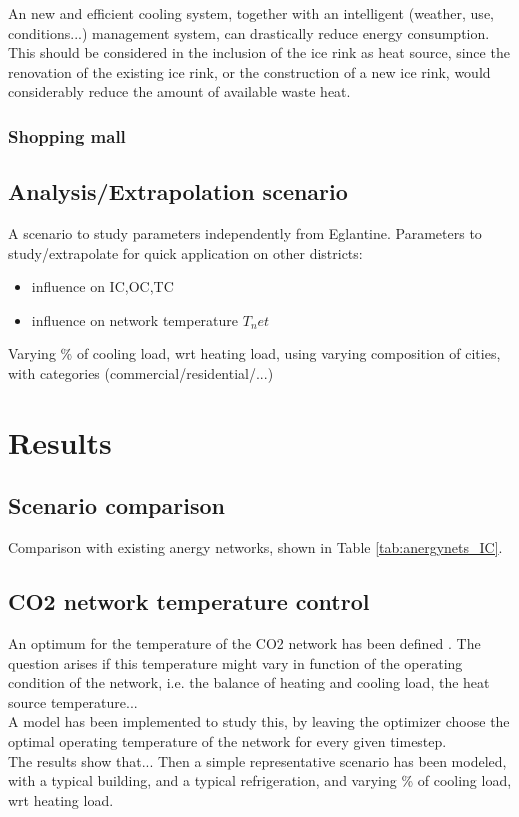 \documentclass{article}
\begin{document}
An new and efficient cooling system, together with an intelligent (weather, use, conditions...) management system, can drastically reduce energy consumption. This should be considered in the inclusion of the ice rink as heat source, since the renovation of the existing ice rink, or the construction of a new ice rink, would considerably reduce the amount of available waste heat.

\subsubsection{Shopping mall}

\subsection{Analysis/Extrapolation scenario}
A scenario to study parameters independently from Eglantine.
Parameters to study/extrapolate for quick application on other districts:
\begin{itemize}
    \item influence on IC,OC,TC
    \item influence on network temperature $T_net$  
\end{itemize}
Varying \% of cooling load, wrt heating load, using varying composition of cities, with categories (commercial/residential/...)


\section{Results}

\subsection{Scenario comparison}
Comparison with existing anergy networks, shown in Table \ref{tab:anergynets_IC}.


\subsection{CO2 network temperature control}
An optimum for the temperature of the CO2 network has been defined .
The question arises if this temperature might vary in function of the operating condition of the network, i.e. the balance of heating and cooling load, the heat source temperature...\\
A model has been implemented to study this, by leaving the optimizer choose the optimal operating temperature of the network for every given timestep.\\
The results show that...
Then a simple representative scenario has been modeled, with a typical building, and a typical refrigeration, and varying \% of cooling load, wrt heating load.
\end{document}
